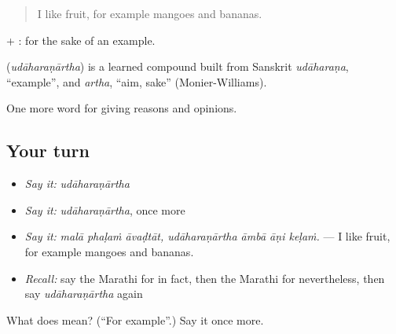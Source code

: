 \begin{quote}
I like fruit, for example mangoes and bananas.
\end{quote}

 + : for the sake of an example.

\begin{cousinweb}
\textbf{} (\emph{udāharaṇārtha}) is a learned compound built from Sanskrit \emph{udāharaṇa}, \textquotedblleft{}example\textquotedblright{}, and \emph{artha}, \textquotedblleft{}aim, sake\textquotedblright{} (Monier-Williams).
\end{cousinweb}

\begin{grammarlens}[title={What you've built}]
One more word for giving reasons and opinions.
\end{grammarlens}

\subsection*{Your turn}
\begin{itemize}
\raggedright
  \item \emph{Say it:} \emph{udāharaṇārtha}
  \item \emph{Say it:} \emph{udāharaṇārtha}, once more
  \item \emph{Say it:} \emph{malā phaḷaṁ āvaḍtāt, udāharaṇārtha āmbā āṇi keḷaṁ.} — I like fruit, for example mangoes and bananas.
  \item \emph{Recall:} say the Marathi for in fact, then the Marathi for nevertheless, then say \emph{udāharaṇārtha} again
\end{itemize}

\begin{tcolorbox}[breakable,colback=teal!4,colframe=teal!35!black,title={Before you move on}]
What does  mean? (\textquotedblleft{}For example\textquotedblright{}.) Say it once more.
\end{tcolorbox}
